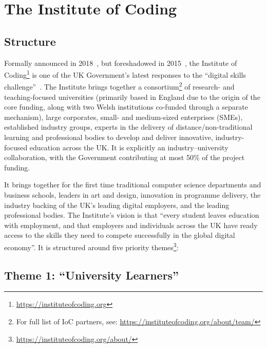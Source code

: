 \documentclass[conference]{IEEEtran}
\begin{document}
\section{The Institute of Coding}\label{ioc}

\subsection{Structure}

Formally announced in 2018~\cite{DfE2018a}, but foreshadowed in
2015~\cite{HMG2015a}, the Institute of
Coding\footnote{\url{https://instituteofcoding.org}} is one of the UK
Government's latest responses to the ``digital skills
challenge''~\cite{davenport-et-al:cep2019}. The Institute brings
together a consortium\footnote{For full list of IoC partners, see:
\url{https://instituteofcoding.org/about/team/}} of research- and
teaching-focused universities (primarily based in England due to the
origin of the core funding, along with two Welsh institutions
co-funded through a separate mechanism), large corporates, small- and
medium-sized enterprises (SMEs), established industry groups, experts
in the delivery of distance/non-traditional learning and professional
bodies to develop and deliver innovative, industry-focused education
across the UK. It is explicitly an industry--university collaboration,
with the Government contributing at most 50\% of the project funding.

It brings together for the first time traditional computer science
departments and business schools, leaders in art and design,
innovation in programme delivery, the industry backing of the UK's
leading digital employers, and the leading professional bodies.  The
Institute's vision is that ``every student leaves education with
employment, and that employers and individuals across the UK have
ready access to the skills they need to compete successfully in the
global digital economy''. It is structured around five priority
themes\footnote{\url{https://instituteofcoding.org/about/}}:

\subsection{Theme 1: ``University Learners''}

\end{document}
